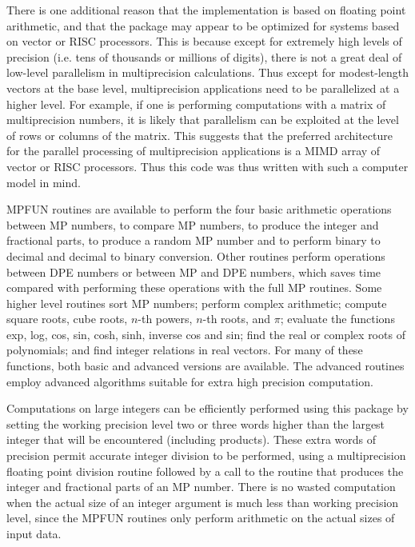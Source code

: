 There is one additional reason that the implementation is based on
floating point arithmetic, and that the package may appear to be
optimized for systems based on vector or RISC processors.  This is
because except for extremely high levels of precision (i.e. tens of
thousands or millions of digits), there is not a great deal of
low-level parallelism in multiprecision calculations.  Thus except for
modest-length vectors at the base level, multiprecision applications
need to be parallelized at a higher level.  For example, if one is
performing computations with a matrix of multiprecision numbers, it is
likely that parallelism can be exploited at the level of rows or
columns of the matrix.  This suggests that the preferred architecture
for the parallel processing of multiprecision applications is a MIMD
array of vector or RISC processors.  Thus this code was thus written
with such a computer model in mind.

MPFUN routines are available to perform the four basic arithmetic
operations between MP numbers, to compare MP numbers, to produce the
integer and fractional parts, to produce a random MP number and to
perform binary to decimal and decimal to binary conversion.  Other
routines perform operations between DPE numbers or between MP and DPE
numbers, which saves time compared with performing these operations
with the full MP routines.  Some higher level routines sort MP
numbers; perform complex arithmetic; compute square roots, cube roots,
$n$-th powers, $n$-th roots, and $\pi$; evaluate the functions exp,
log, cos, sin, cosh, sinh, inverse cos and sin; find the real or
complex roots of polynomials; and find integer relations in real
vectors.  For many of these functions, both basic and advanced
versions are available.  The advanced routines employ advanced
algorithms suitable for extra high precision computation.

Computations on large integers can be efficiently performed using this
package by setting the working precision level two or three words
higher than the largest integer that will be encountered (including
products).  These extra words of precision permit accurate integer
division to be performed, using a multiprecision floating point
division routine followed by a call to the routine that produces the
integer and fractional parts of an MP number.  There is no wasted
computation when the actual size of an integer argument is much less
than working precision level, since the MPFUN routines only perform
arithmetic on the actual sizes of input data.

